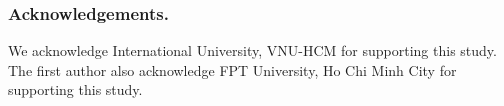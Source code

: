\documentclass[runningheads]{llncs}
\begin{document}
\subsubsection*{Acknowledgements.}
We acknowledge International University, VNU-HCM for supporting this study. The first author also acknowledge FPT University, Ho Chi Minh City for supporting this study. 





\end{document}
